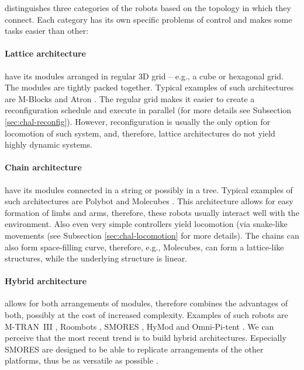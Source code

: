 \textcite{4141032} distinguishes three categories of the robots based on the
topology in which they connect. Each category has its own specific problems of
control and makes some tasks easier than other:

\paragraph{Lattice architecture} have its modules arranged in regular 3D grid --
e.g., a cube or hexagonal grid. The modules are tightly packed together. Typical
examples of such architectures are M-Blocks \cite{DBLP:conf/iros/RomanishinGR13}
and Atron \cite{DBLP:conf/iros/JorgensenOL04}. The regular grid makes it easier
to create a reconfiguration schedule and execute in parallel (for more details
see Subsection \ref{sec:chal-reconfig}). However, reconfiguration is usually the
only option for locomotion of such system, and, therefore, lattice architectures
do not yield highly dynamic systems.

\paragraph{Chain architecture} have its modules connected in a string or
possibly in a tree. Typical examples of such architectures are Polybot
\cite{DBLP:conf/icra/YimDR00} and Molecubes
\cite{DBLP:journals/trob/ZykovMDL07}. This architecture allows for easy
formation of limbs and arms, therefore, these robots usually interact well with
the environment. Also even very simple controllers yield locomotion (via
snake-like movements (see Subsection \ref{sec:chal-locomotion} for more
details). The chains can also form space-filling curve, therefore, e.g.,
Molecubes, can form a lattice-like structures, while the underlying structure is
linear.

\paragraph{Hybrid architecture} allows for both arrangements of modules,
therefore combines the advantages of both, possibly at the cost of increased
complexity. Examples of such robots are M-TRAN~III
\cite{DBLP:journals/ijrr/KurokawaTKKHM08}, Roombots
\cite{DBLP:conf/icra/SprowitzBDI09}, SMORES \cite{DBLP:conf/iros/DaveyKY12},
HyMod \cite{DBLP:conf/dars/ParrottDG16} and Omni-Pi-tent
\cite{DBLP:conf/taros/PeckTT19}. We can perceive that the most recent trend is
to build hybrid architectures. Especially SMORES are designed to be able to
replicate arrangements of the other platforms, thus be as versatile as possible
\cite{DBLP:conf/iros/DaveyKY12}.

